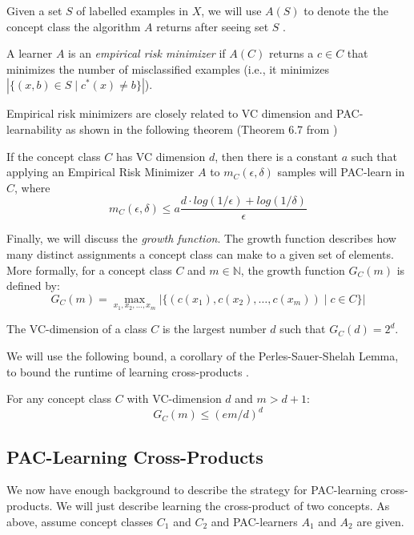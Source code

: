 Given a set $S$ of labelled examples in $X$, we will use $A(S)$ to denote the the concept class the algorithm $A$ returns after seeing set $S$ .


A learner $A$ is an \emph{empirical risk minimizer} if $A(C)$ returns a $c \in C$ that minimizes the number of misclassified examples (i.e., it minimizes $|\{(x,b) \in S \mid c^*(x) \ne b\}|$). 

Empirical risk minimizers are closely related to VC dimension and PAC-learnability as shown in the following theorem (Theorem 6.7 from \cite{shalev2014understanding})

\begin{theorem}
\label{fundpac}
If the concept class $C$ has VC dimension $d$, then there is a constant $a$ such that applying an Empirical Risk Minimizer $A$ to $m_C(\epsilon, \delta)$ samples will PAC-learn in $C$, where
\[m_C(\epsilon, \delta) \le a \frac{d \cdot log(1/\epsilon) + log(1/\delta)}{\epsilon} \]
\end{theorem}

Finally, we will discuss the \emph{growth function}. 
The growth function describes how many distinct assignments a concept class can make to a given set of elements.  
More formally, for a concept class $C$ and $m \in \mathbb{N}$, the growth function $G_C(m)$ is defined by:
\[ G_C(m) = \max_{x_1,x_2,\dots,x_m}|\{ (c(x_1), c(x_2), \dots, c(x_m)) \mid c \in C\}| \]

The VC-dimension of a class $C$ is the largest number $d$ such that $G_C(d) = 2^d$. 

We will use the following bound, a corollary of the Perles-Sauer-Shelah Lemma, to bound the runtime of learning cross-products \cite{shalev2014understanding}. 

\begin{lemma}
\label{pss}
For any concept class $C$ with VC-dimension $d$ and $m > d+1$:
\[ G_C(m) \le (em/d)^d\]
\end{lemma}

\subsection{PAC-Learning Cross-Products}

We now have enough background to describe the strategy for PAC-learning cross-products.
We will just describe learning the cross-product of two concepts.  
As above, assume concept classes $C_1$ and $C_2$ and PAC-learners $A_1$ and $A_2$ are given.


